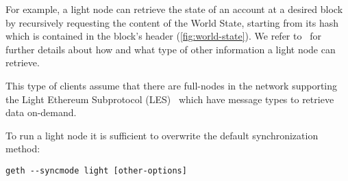 For example, a light node can retrieve the state of an account at a desired
block by recursively requesting the content of the World State, starting from
its hash which is contained in the block's header (\autoref{fig:world-state}).
We refer to~\cite{bib:light-client} for further details about how and what type
of other information a light node can retrieve.

This type of clients assume that there are full-nodes in the network supporting
the Light Ethereum Subprotocol (LES)~\cite{bib:les-protocol} which have message
types to retrieve data on-demand.

To run a light node it is sufficient to overwrite the default synchronization
method:
\begin{center}
    \verb|geth --syncmode light [other-options]|
\end{center}